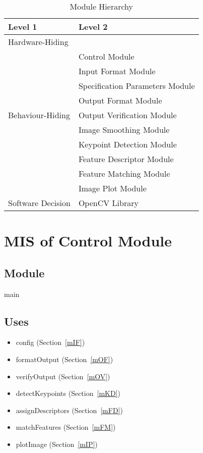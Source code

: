 \documentclass[12pt, titlepage]{article}
\begin{document}
\begin{table}[h!]
\centering
\begin{tabular}{p{} p{}}
\toprule
\textbf{Level 1} & \textbf{Level 2}\\
\midrule

{Hardware-Hiding} & ~ \\
\midrule

\multirow{9}{0.3\textwidth}{Behaviour-Hiding} & Control Module\\
& Input Format Module \\
& Specification Parameters Module \\
& Output Format Module \\
& Output Verification Module \\
& Image Smoothing Module \\
& Keypoint Detection Module \\
& Feature Descriptor Module \\
& Feature Matching Module \\
& Image Plot Module \\
\midrule

\multirow{1}{0.3\textwidth}{Software Decision} & OpenCV Library \\
\bottomrule
 
\end{tabular}
\caption{Module Hierarchy}
\label{TblMH}
\end{table}

\newpage

\section{MIS of Control Module} \label{mC}
\subsection{Module}
main

\subsection{Uses}
\begin{itemize}
  \item config (Section~\ref{mIF})
  \item formatOutput (Section~\ref{mOF})
  \item verifyOutput (Section~\ref{mOV})
  \item detectKeypoints (Section~\ref{mKD})
  \item assignDescriptors (Section~\ref{mFD})
  \item matchFeatures (Section~\ref{mFM})
  \item plotImage (Section~\ref{mIP})

\end{itemize}
\end{document}
